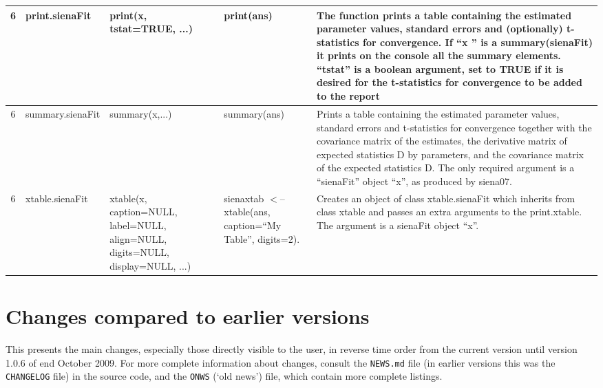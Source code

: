 \documentclass[a4paper,fleqn,11pt]{article}
\newcommand{\+}{\, + \,}
\begin{document}
\begin{landscape}
\begin{small}
\begin{longtable}{c | p{2.4cm} | p{4.5cm} | p{4.0cm} | p{9.0cm} }
6 & print.sienaFit & print(x, tstat=TRUE, ...) & print(ans) & The function
prints a table containing the estimated parameter values, standard errors and
(optionally) t-statistics for convergence. If ``x '' is a summary(sienaFit) it
prints on the console all the summary elements. ``tstat'' is a boolean
argument, set to TRUE if it is desired for the t-statistics for convergence to
be added to the report\\
\hline

6 & summary.sienaFit & summary(x,...) & summary(ans) & Prints a table
containing the estimated parameter values, standard errors and t-statistics for
convergence together with the covariance matrix of the estimates, the
derivative matrix of expected statistics D by parameters, and the covariance
matrix of the expected statistics D.  The only required argument is a
``sienaFit'' object ``x'', as produced by  siena07.\\
\hline

6 & xtable.sienaFit & xtable(x, caption=NULL, \newline
label=NULL, align=NULL, \newline
digits=NULL,\newline
 display=NULL, ...) & sienaxtab $<$-- \newline
 xtable(ans, \newline
caption=``My
Table'', \newline
digits=2).  &Creates an object of class xtable.sienaFit which inherits
from class xtable and passes an extra arguments to the print.xtable.
The argument is a sienaFit object ``x''. \\
\hline


\end{longtable}
\end{small}
\end{landscape}


%



\section{Changes compared to earlier versions}

This presents the main changes, especially those directly visible to the user,
in reverse time order from the current version until
version 1.0.6 of end October 2009.
For more complete information about changes,
consult the \texttt{NEWS.md} file (in earlier versions
this was the \texttt{CHANGELOG} file) in the source code,
and the \texttt{ONWS} (`old news') file, which contain more complete listings.
\end{document}
